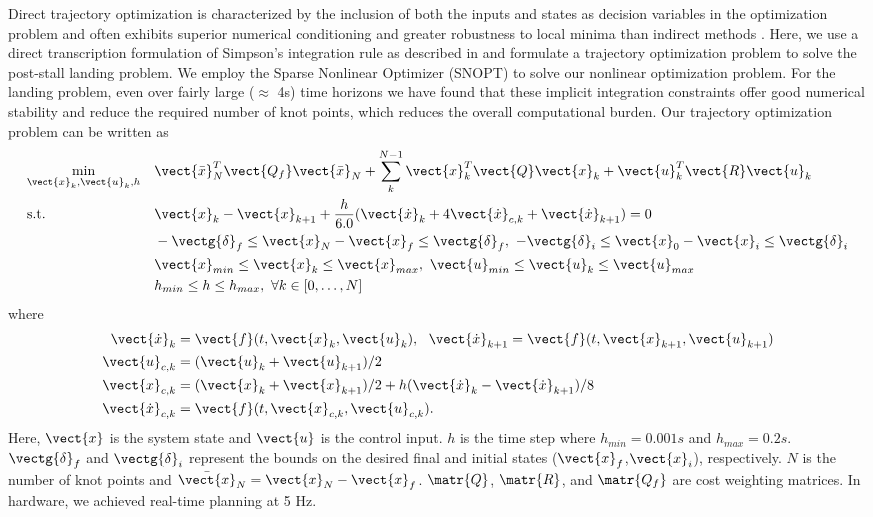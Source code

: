 Direct trajectory optimization is characterized by the inclusion of both the inputs and states as decision variables in the optimization problem \cite{pardo2016evaluating} and often exhibits superior numerical conditioning and greater robustness to local minima than indirect methods \cite{tedrake2009underactuated}. Here, we use a direct transcription formulation of Simpson's integration rule as described in \cite{pardo2016evaluating} and formulate a trajectory optimization problem to solve the post-stall landing problem. We employ the Sparse Nonlinear Optimizer (SNOPT) \cite{Gill:2005:Snopt} to solve our nonlinear optimization problem. For the landing problem, even over fairly large ($\approx$ 4s) time horizons we have found that these implicit integration constraints offer good numerical stability and reduce the required number of knot points, which reduces the overall computational burden. Our trajectory optimization problem can be written as
\begin{equation}
\begin{aligned}
& \underset{\vect{x}_k, \vect{u}_k, h }{\text{min}}
& & \vect{\bar{x}}_N^T \vect{Q_f} \vect{\bar{x}}_N + \sum_k^{N-1}{ \vect{x}_k^T \vect{Q}  \vect{x}_k + \vect{u}_k^T \vect{R}  \vect{u}_k}\\
& \text{s.t.}
& & \vect{x}_{k} - \vect{x}_{k+1} + \frac{h}{6.0}(\vect{\dot{x}}_{k} + 4 \vect{\dot{x}}_{c,k} + \vect{\dot{x}}_{k+1})= 0\\
&
& & -\vectg{\delta}_f \le \vect{x}_{N}-\vect{x}_f \le \vectg{\delta}_f,~ -\vectg{\delta}_i \le \vect{x}_{0}-\vect{x}_i \le \vectg{\delta}_i\\
&
& & \vect{x}_{min}  \le \vect{x}_{k} \le \vect{x}_{max},~ \vect{u}_{min}  \le \vect{u}_{k} \le \vect{u}_{max}\\
&
&  & h_{min}  \le h \le h_{max},~ \forall k \in [0,\ldots,N]
\end{aligned}
\end{equation}
where 
\begin{align}
\vect{\dot{x}}_{k} &= \vect{f}(t, \vect{x}_{k}, \vect{u}_{k}),~~
\vect{\dot{x}}_{k+1} = \vect{f}(t, \vect{x}_{k+1}, \vect{u}_{k+1})\nonumber\\
\vect{u}_{c,k} &= (\vect{u}_{k} + \vect{u}_{k+1}) / 2\nonumber\\
\vect{x}_{c,k} &= (\vect{x}_{k} + \vect{x}_{k+1}) / 2 + h (\vect{\dot{x}}_{k} - \vect{\dot{x}}_{k+1}) / 8\nonumber\\
\vect{\dot{x}}_{c,k} &= \vect{f}(t, \vect{x}_{c,k}, \vect{u}_{c,k}).
\end{align}
Here, $\vect{x}$ is the system state and $\vect{u}$ is the control input. $h$ is the time step where $h_{min}=0.001s$ and $h_{max}=0.2s$. $\vectg{\delta}_f$ and $\vectg{\delta}_i$ represent the bounds on the desired final and initial states ($\vect{x}_f$,$\vect{x}_i$), respectively. $N$ is the number of knot points and $\bar{\vect{x}}_N = \vect{x}_N-\vect{x}_f$. $\matr{Q}$, $\matr{R}$, and $\matr{Q_f}$ are cost weighting matrices. In hardware, we achieved real-time planning at 5 Hz.
